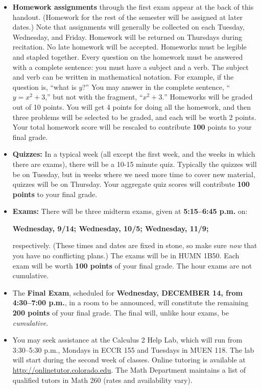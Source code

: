 \documentclass[12pt]{article}
\begin{document}
{{\begin{itemize}
\item[] {\bf Homework assignments} through the first
exam appear at the back of this handout.  (Homework for the rest of
the semester will be assigned at later dates.)  Note that assignments
will generally be collected on each Tuesday, Wednesday, and Friday.  
Homework will be returned on Thursdays during recitation. No late
homework will be accepted.  Homeworks must be legible and stapled
together. Every question on the homework
must be answered with a complete sentence: you must have a subject and
a verb. The subject and verb can be written in mathematical notation.
For example, if the question is, ``what is $y$?'' You may answer in the
complete sentence,
``$y=x^2+3$,'' but not with the fragment, ``$x^2+3.$''
Homeworks will be graded out of 10 points. You will
get 4 points for doing all the homework, and then three problems
will be selected to be graded, and each will be worth 2 points.
Your total homework score will be rescaled to contribute
{\bf 100} points to your final grade.
\smallskip
\item[] {\bf Quizzes:} In a typical week (all except the first week, and the weeks in
which there are exams), there will be a 10-15 minute quiz. Typically the
quizzes will be on Tuesday, but in weeks where we need more time to cover
new material, quizzes will be on Thursday. Your aggregate
quiz scores will contribute {\bf 100 points} to your final grade.
\smallskip
\item[] {\bf Exams:}  There will be three  midterm exams, given at {\bf 5:15--6:45 p.m.} on:

\vskip 2pt
\smallskip
\centerline {\bf Wednesday, 9/14; Wednesday, 10/5; Wednesday, 11/9;}
\vskip 2pt

respectively.  (These times and dates are fixed in stone, so make sure {\it now} that you have no conflicting plans.)  The exams will be in HUMN 1B50.  Each exam will be worth {\bf 100 points} of your final grade. The hour exams are not cumulative.
\smallskip
\item[] The {\bf Final Exam}, scheduled for {\bf Wednesday, DECEMBER 14, from 4:30--7:00 p.m.}, in a room to be announced, will constitute the remaining {\bf 200 points} of your final grade.  The final will, unlike hour exams, be {\it cumulative}.
\end{itemize}

\vskip 10pt

\begin{itemize}
\item[] You may seek assistance at the Calculus 2 Help Lab, which will run from 3:30--5:30 p.m., Mondays in ECCR 155 and Tuesdays in MUEN 118. The lab will start during the second week of classes. Online tutoring is available at \url{http://onlinetutor.colorado.edu}. The Math Department maintains a list of qualified tutors in Math 260 (rates and availability vary).
\end{itemize}

}}
\end{document}
